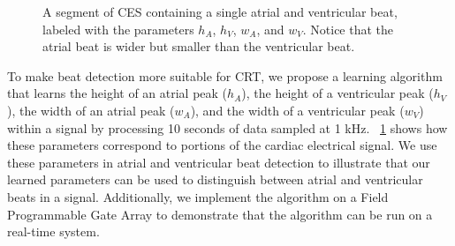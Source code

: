 \documentclass[conference]{IEEEtran}
\newcommand{\APW}{\ensuremath{w_A}}
\newcommand{\VPW}{\ensuremath{w_V}}
\newcommand{\APH}{\ensuremath{h_A}}
\newcommand{\VPH}{\ensuremath{h_V}}
\begin{document}
\begin{figure}
	\centering
	\caption{
	A segment of CES containing a single atrial and ventricular beat, labeled with the parameters \APH, \VPH, \APW, and \VPW. 
	Notice that the atrial beat is wider but smaller than the ventricular beat.}
	\label{fig:singlebeat}
\end{figure}
To make beat detection more suitable for CRT,
we propose a learning algorithm that learns the
height of an atrial peak (\APH), the height of a ventricular
peak (\VPH), the width of an atrial peak (\APW), and the
width of a ventricular peak (\VPW) within a signal 
by processing 10 seconds of data sampled
at 1 kHz. 
\figurename~\ref{fig:singlebeat} shows how these parameters correspond to portions of the cardiac electrical signal.
We use these parameters in atrial and ventricular beat detection to illustrate that our learned parameters can be used to distinguish between atrial and ventricular beats in a signal. 
Additionally, we implement the algorithm on a Field
Programmable Gate Array to demonstrate that the
algorithm can be run on a real-time system.
\end{document}
